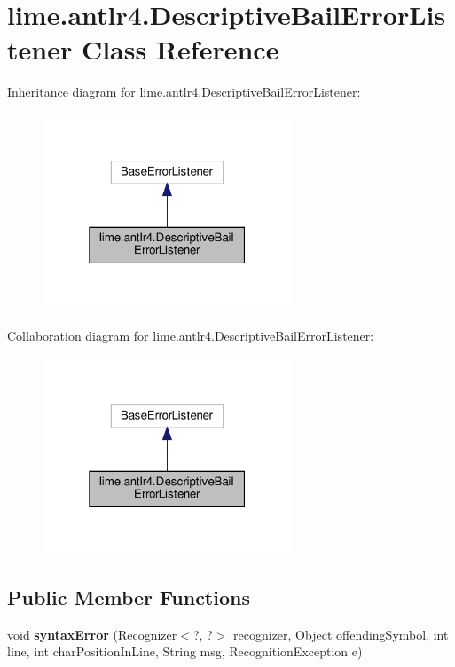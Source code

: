\hypertarget{classlime_1_1antlr4_1_1DescriptiveBailErrorListener}{}\section{lime.\+antlr4.\+Descriptive\+Bail\+Error\+Listener Class Reference}
\label{classlime_1_1antlr4_1_1DescriptiveBailErrorListener}


Inheritance diagram for lime.\+antlr4.\+Descriptive\+Bail\+Error\+Listener\+:
\nopagebreak
\begin{figure}[H]
\begin{center}
\leavevmode
\includegraphics[width=211pt]{classlime_1_1antlr4_1_1DescriptiveBailErrorListener__inherit__graph}
\end{center}
\end{figure}


Collaboration diagram for lime.\+antlr4.\+Descriptive\+Bail\+Error\+Listener\+:
\nopagebreak
\begin{figure}[H]
\begin{center}
\leavevmode
\includegraphics[width=211pt]{classlime_1_1antlr4_1_1DescriptiveBailErrorListener__coll__graph}
\end{center}
\end{figure}
\subsection*{Public Member Functions}
\begin{DoxyCompactItemize}
\item 
\mbox{\label{classlime_1_1antlr4_1_1DescriptiveBailErrorListener_a88c7997d1d94ac3564a67d80b7b10780}} 
void {\bfseries syntax\+Error} (Recognizer$<$?, ?$>$ recognizer, Object offending\+Symbol, int line, int char\+Position\+In\+Line, String msg, Recognition\+Exception e)
\end{DoxyCompactItemize}


